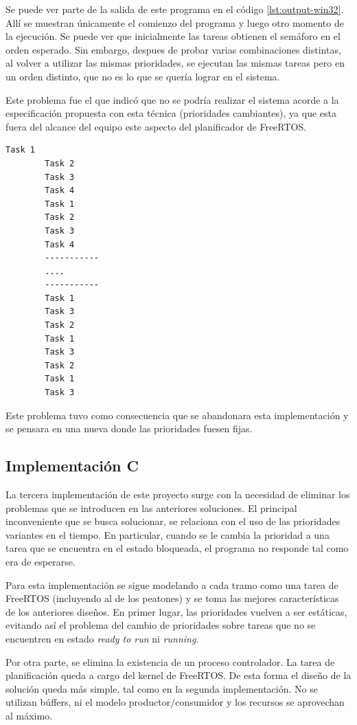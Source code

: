 	Se puede ver parte de la salida de este programa en el código \ref{lst:output-win32}. Allí se muestran únicamente el comienzo del programa y luego otro momento de la ejecución. Se puede ver que inicialmente las tareas obtienen el semáforo en el orden esperado. Sin embargo, despues de probar varias combinaciones distintas, al volver a utilizar las mismas prioridades, se ejecutan las mismas tareas pero en un orden distinto, que no es lo que se quería lograr en el sistema.

	Este problema fue el que indicó que no se podría realizar el sistema acorde a la especificación propuesta con esta técnica (prioridades cambiantes), ya que esta fuera del alcance del equipo este aspecto del planificador de FreeRTOS.

	\begin{lstlisting}[float, label=lst:output-win32, caption=Salida del programa de prueba escrito para Win32.]
		Task 1
		Task 2
		Task 3
		Task 4
		Task 1
		Task 2
		Task 3
		Task 4
		-----------
		....
		-----------
		Task 1
		Task 3
		Task 2
		Task 1
		Task 3
		Task 2
		Task 1
		Task 3
	\end{lstlisting}

	Este problema tuvo como consecuencia que se abandonara esta implementación y se pensara en una nueva donde las prioridades fuesen fijas.



	\subsection{Implementación C}
	La tercera implementación de este proyecto surge con la necesidad de eliminar los problemas que se introducen en las anteriores soluciones.
	El principal inconveniente que se busca solucionar, se relaciona con el uso de las prioridades variantes en el tiempo.
	En particular, cuando se le cambia la prioridad a una tarea que se encuentra en el estado bloqueada, el programa no responde tal como era de esperarse.

	Para esta implementación se sigue modelando a cada tramo como una tarea de FreeRTOS (incluyendo al de los peatones) y se toma las mejores características de los anteriores diseños.
	En primer lugar, las prioridades vuelven a ser estáticas, evitando así el problema del cambio de prioridades sobre tareas que no se encuentren en estado \emph{ready to run} ni \emph{running}.

	Por otra parte, se elimina la existencia de un proceso controlador.
	La tarea de planificación queda a cargo del kernel de FreeRTOS.
	De esta forma el diseño de la solución queda más simple, tal como en la segunda implementación.
	No se utilizan búffers, ni el modelo productor/consumidor y los recursos se aprovechan al máximo.

